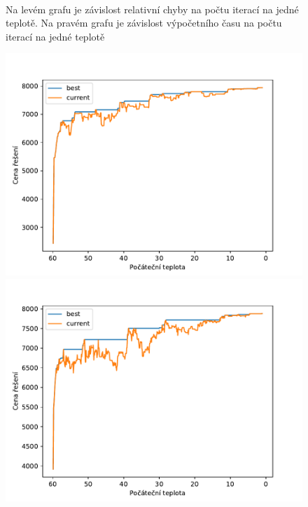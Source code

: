 \documentclass[11pt]{article}
\begin{document}
\begin{figure}
\begin{minipage}[c]{0.49\textwidth}
    \end{minipage}
    \\
   \caption{Na levém grafu je závislost relativní chyby na počtu iterací na jedné teplotě. Na pravém grafu je závislost výpočetního času na počtu iterací na jedné teplotě}\label{fig:GVI}
\end{figure} 

\begin{figure}
	\centering
    \begin{minipage}[c]{0.325\textwidth}
        \centering\includegraphics[width=\textwidth]{img/C30.pdf} 
    \end{minipage}
    \begin{minipage}[c]{0.325\textwidth}
        \centering \includegraphics[width=\textwidth]{img/C60.pdf} 

\end{minipage}
\end{figure}
\end{document}
